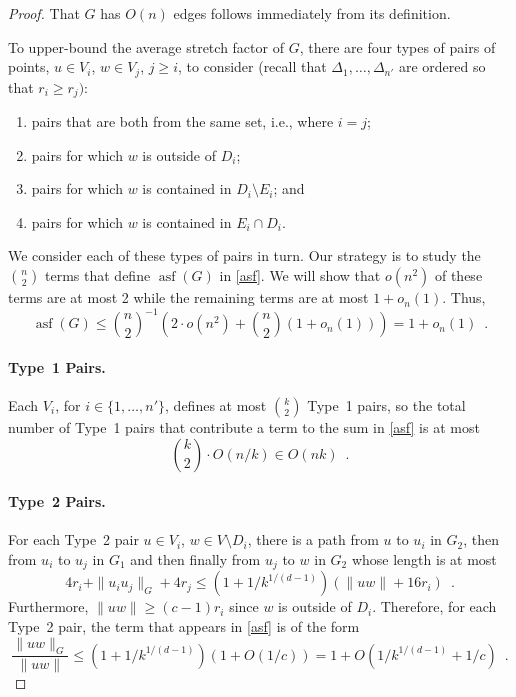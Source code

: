 \documentclass{patmorin}
\DeclareMathOperator{\asf}{asf}
\begin{document}
\begin{proof}
  That $G$ has $O(n)$ edges follows immediately from its definition.

  To upper-bound the average stretch factor of $G$, there are four types
  of pairs of points, $u\in V_i$, $w\in V_j$, $j\ge i$, to consider
  (recall that $\Delta_1,\ldots,\Delta_{n'}$ are ordered so that $r_i \ge r_j)$:
  \begin{enumerate}
    \item pairs that are both from the same set, i.e., where $i=j$;
    \item pairs for which $w$ is outside of $D_i$;
    \item pairs for which $w$ is contained in $D_i\setminus E_i$; and
    \item pairs for which $w$ is contained in $E_i\cap D_i$.
  \end{enumerate}
  We consider each of these types of pairs in turn.  Our strategy is to
  study the $\binom{n}{2}$ terms that define $\asf(G)$ in \eqref{asf}.
  We will show that $o(n^2)$ of these terms are at most 2 while the
  remaining terms are at most $1+o_n(1)$.  Thus,
  \[
     \asf(G)\le \binom{n}{2}^{-1}\left(2\cdot o(n^2)
                                       +\binom{n}{2}(1+o_n(1))\right)
     = 1+o_n(1) \enspace .
  \]

  \paragraph{Type~1 Pairs.}
  Each $V_i$, for $i\in\{1,\ldots,n'\}$, defines at most $\binom{k}{2}$
  Type~1 pairs, so the total number of Type~1 pairs that contribute a
  term to the sum in \eqref{asf} is at most
  \[
    \binom{k}{2}\cdot O(n/k) \in O(nk)
      \enspace .
  \]

  \paragraph{Type~2 Pairs.}
  For each Type~2 pair $u\in V_i$, $w\in V\setminus D_i$, there is a
  path from $u$ to $u_i$ in $G_2$, then from $u_i$ to $u_j$ in $G_1$
  and then finally from $u_j$ to $w$ in $G_2$ whose length is at most
  \[
     4r_i + \|u_iu_j\|_G + 4r_j
      \le (1+1/k^{1/(d-1)})(\|uw\| + 16r_i) \enspace .
  \]
  Furthermore, $\|uw\|\ge (c-1)r_i$ since $w$ is outside of $D_i$.
  Therefore, for each Type~2 pair, the term that appears in \eqref{asf}
  is of the form
  \[
    \frac{\|uw\|_G}{\|uw\|}\le (1+1/k^{1/(d-1)})(1+O(1/c)) 
       = 1+O(1/k^{1/(d-1)}+1/c) \enspace .
  \]


\end{proof}
\end{document}
